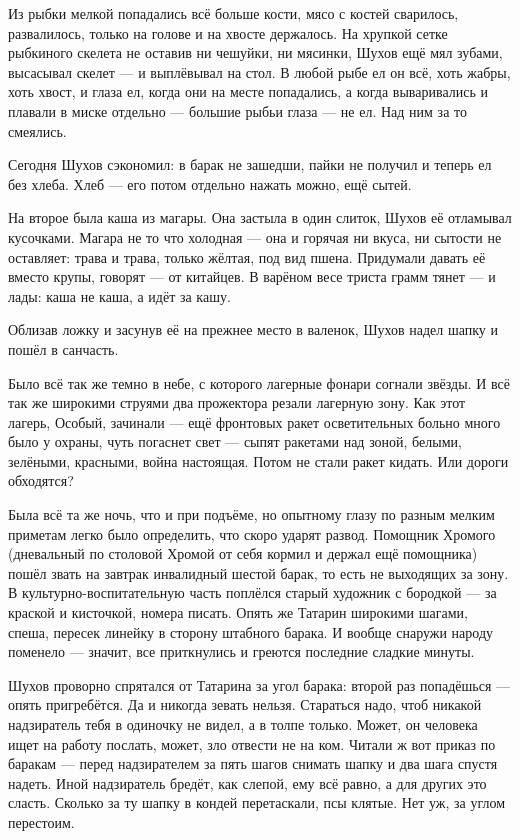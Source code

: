 Из рыбки мелкой попадались всё больше кости, мясо с костей сварилось, развалилось, только на 
голове и на хвосте держалось. На хрупкой сетке рыбкиного скелета не оставив ни чешуйки, ни 
мясинки, Шухов ещё мял зубами, высасывал скелет --- и выплёвывал на стол. В любой рыбе ел он 
всё, хоть жабры, хоть хвост, и глаза ел, когда они на месте попадались, а когда вываривались и 
плавали в миске отдельно --- большие рыбьи глаза --- не ел. Над ним за то смеялись.

Сегодня Шухов сэкономил: в барак не зашедши, пайки не получил и теперь ел без хлеба. Хлеб --- 
его потом отдельно нажать можно, ещё сытей.

На второе была каша из магары. Она застыла в один слиток, Шухов её отламывал кусочками. 
Магара не то что холодная --- она и горячая ни вкуса, ни сытости не оставляет: трава и трава, 
только жёлтая, под вид пшена. Придумали давать её вместо крупы, говорят --- от китайцев. В 
варёном весе триста грамм тянет --- и лады: каша не каша, а идёт за кашу.

Облизав ложку и засунув её на прежнее место в валенок, Шухов надел шапку и пошёл в санчасть.

Было всё так же темно в небе, с которого лагерные фонари согнали звёзды. И всё так же широкими 
струями два прожектора резали лагерную зону. Как этот лагерь, Особый, зачинали --- ещё 
фронтовых ракет осветительных больно много было у охраны, чуть погаснет свет --- сыпят 
ракетами над зоной, белыми, зелёными, красными, война настоящая. Потом не стали ракет кидать. 
Или дороги обходятся?

Была всё та же ночь, что и при подъёме, но опытному глазу по разным мелким приметам легко было 
определить, что скоро ударят развод. Помощник Хромого (дневальный по столовой Хромой от себя 
кормил и держал ещё помощника) пошёл звать на завтрак инвалидный шестой барак, то есть не 
выходящих за зону. В культурно-воспитательную часть поплёлся старый художник с бородкой --- 
за краской и кисточкой, номера писать. Опять же Татарин широкими шагами, спеша, пересек 
линейку в сторону штабного барака. И вообще снаружи народу поменело --- значит, все 
приткнулись и греются последние сладкие минуты.

Шухов проворно спрятался от Татарина за угол барака: второй раз попадёшься --- опять 
пригребётся. Да и никогда зевать нельзя. Стараться надо, чтоб никакой надзиратель тебя в 
одиночку не видел, а в толпе только. Может, он человека ищет на работу послать, может, зло 
отвести не на ком. Читали ж вот приказ по баракам --- перед надзирателем за пять шагов снимать 
шапку и два шага спустя надеть. Иной надзиратель бредёт, как слепой, ему всё равно, а для 
других это сласть. Сколько за ту шапку в кондей перетаскали, псы клятые. Нет уж, за углом 
перестоим.

